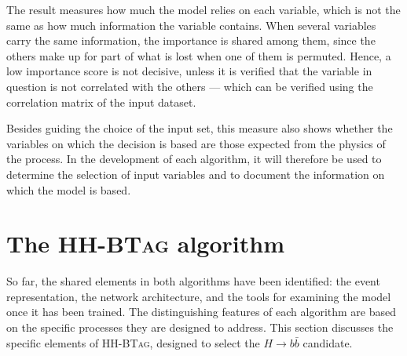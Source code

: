 The result measures how much the model relies on each variable, which is not the same as how much information the variable contains. When several variables carry the same information, the importance is shared among them, since the others make up for part of what is lost when one of them is permuted. Hence, a low importance score is not decisive, unless it is verified that the variable in question is not correlated with the others — which can be verified using the correlation matrix of the input dataset.\medskip








Besides guiding the choice of the input set, this measure also shows whether the variables on which the decision is based are those expected from the physics of the process. In the development of each algorithm, it will therefore be used to determine the selection of input variables and to document the information on which the model is based.



\section{The \textsc{HH-BTag} algorithm}
\label{sec:HHBTag}
%
So far, the shared elements in both algorithms have been identified: the event representation, the network architecture, and the tools for examining the model once it has been trained. The distinguishing features of each algorithm are based on the specific processes they are designed to address. This section discusses the specific elements of \textsc{HH-BTag}, designed to select the $H\rightarrow b\bar{b}$ candidate.

